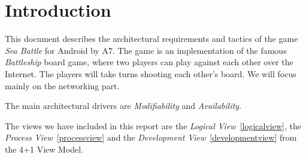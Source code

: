 \section{Introduction}
This document describes the architectural requirements and tactics of the game \textit{Sea Battle} for Android by A7. The game is an implementation of the famous \textit{Battleship} board game, where two players can play against each other over the Internet. The players will take turns shooting each other's board. We will focus mainly on the networking part.  

The main architectural drivers are \textit{Modifiability} and \textit{Availability}.

The views we have included in this report are the \textit{Logical View}~\ref{logicalview}, the \textit{Process View}~\ref{processview} and the \textit{Development View}~\ref{developmentview} from the 4+1 View Model.
